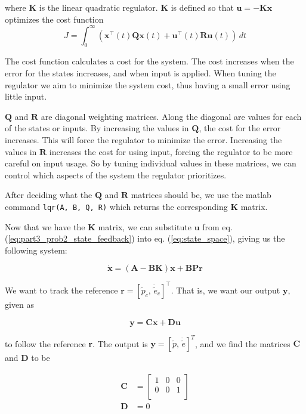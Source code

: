 where $\bm{K}$ is the linear quadratic regulator. $\bm{K}$ is defined so that $\bm{u} = - \bm{K}\bm{x}$ optimizes the cost function
\begin{equation} \label{eq:cost_function}
    J = \int_0^\infty (\bm{x}^\top(t) \bm{Q} \bm{x}(t) +\bm{u}^\top(t) \bm{R} \bm{u} (t) ) \,dt 
\end{equation}

The cost function calculates a cost for the system. The cost increases when the error for the states increases, and when input is applied. When tuning the regulator we aim to minimize the system cost, thus having a small error using little input. \medskip

$\bm{Q}$ and $\bm{R}$ are diagonal weighting matrices. Along the diagonal are values for each of the states or inputs. By increasing the values in $\bm{Q}$, the cost for the error increases. This will force the regulator to minimize the error. Increasing the values in $\bm{R}$ increases the cost for using input, forcing the regulator to be more careful on input usage. So by tuning individual values in these matrices, we can control which aspects of the system the regulator prioritizes.\medskip

After deciding what the $\bm{Q}$ and $\bm{R}$ matrices should be, we use the matlab command \texttt{lqr(A, B, Q, R)} which returns the corresponding $\bm{K}$ matrix.
\medskip

Now that we have the $\bm{K}$ matrix, we can substitute $\bm{u}$ from eq. (\ref{eq:part3_prob2_state_feedback}) into eq. (\ref{eq:state_space}), giving us the following system:

\begin{equation}
    \dot{\bm{x}} = (\bm{A} - \bm{BK})\bm{x} + \bm{B}\bm{P}\bm{r}
\end{equation}

We want to track the reference $\bm{r} = [\tilde{p}_c, \, \dot{\tilde{e}}_c] ^\top$. That is, we want our output $\bm{y}$, given as

\begin{equation}\label{eq:y_p3_p2}
    \bm{y} = \bm{C} \bm{x} + \bm{D} \bm{u}
\end{equation}

to follow the reference $\bm{r}$. The output is $\bm{y} = [\tilde{p}, \, \dot{\tilde{e}}]^T$, and we find the matrices $\bm{C}$ and $\bm{D}$ to be

\begin{align}
    \bm{C} &= 
	\begin{bmatrix}
		1   &  0 &  0 \\
		0   &  0 &  1 \\
	\end{bmatrix}\\
	\bm{D} &= 0
\end{align}

